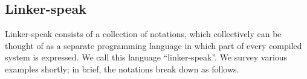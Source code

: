 % 
% 
% 
% 
% 
% 
% 
% 


\subsection{Linker-speak}

Linker-speak consists of a collection of notations,
which collectively can be thought of as a separate programming language
in which part of every compiled system is expressed.
We call this language ``linker-speak''.
We survey various examples shortly; in brief, the notations
break down as follows.

